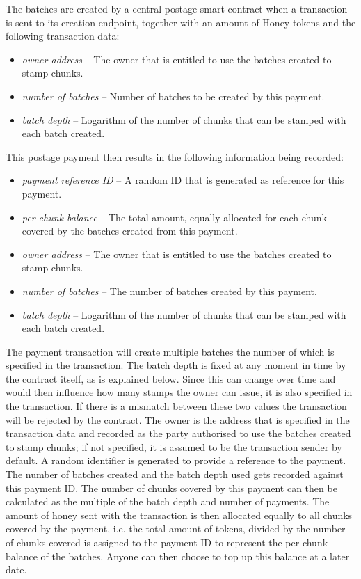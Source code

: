 The batches are created by a central postage smart contract when a transaction is sent to its creation endpoint, together with an amount of Honey tokens and the following transaction data:

\begin{itemize}
\item \emph{owner address} -- The owner that is entitled to use the batches created to stamp chunks.
\item \emph{number of batches} -- Number of batches to be created by this payment.
\item \emph{batch depth} -- Logarithm of the number of chunks that can be stamped with each batch created.
\end{itemize}

This postage payment then results in the following information being recorded:

\begin{itemize}
\item \emph{payment reference ID} -- A random ID that is generated as reference for this payment.
\item \emph{per-chunk balance} -- The total amount, equally allocated for each chunk covered by the batches created from this payment.
\item \emph{owner address} -- The owner that is entitled to use the batches created to stamp chunks.
\item \emph{number of batches} -- The number of batches created by this payment.
\item \emph{batch depth} -- Logarithm of the number of chunks that can be stamped with each batch created.
\end{itemize}

The payment transaction will create multiple batches the number of which is specified in the transaction. The batch depth is fixed at any moment in time by the contract itself, as is explained below. Since this can change over time and would then influence how many stamps the owner can issue, it is also specified in the transaction. If there is a mismatch between these two values the transaction will be rejected by the contract.
The owner is the address that is specified in the transaction data and recorded as the party authorised to use the batches created to stamp chunks; if not specified, it is assumed to be the transaction sender by default. A random identifier is generated to provide a reference to the payment. The number of batches created and the batch depth used gets recorded against this payment ID. The number of chunks covered by this payment can then be calculated as the multiple of the batch depth and number of payments. The amount of honey sent with the transaction is then allocated equally to all chunks covered by the payment, i.e. the total amount of tokens, divided by the number of chunks covered is assigned to the payment ID to represent the per-chunk balance of the batches. Anyone can then choose to top up this balance at a later date. 


